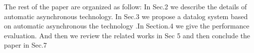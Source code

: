 \begin{itemize}
\end{itemize}

The rest of the paper are organized as follow: In Sec.2 we describe the details of  automatic asynchronous technology. In Sec.3 we propose a datalog system based on automatic asynchronous the technology .In Section.4  we give the performance evaluation. And then we review the related works in Sec 5 and then conclude the paper in Sec.7
